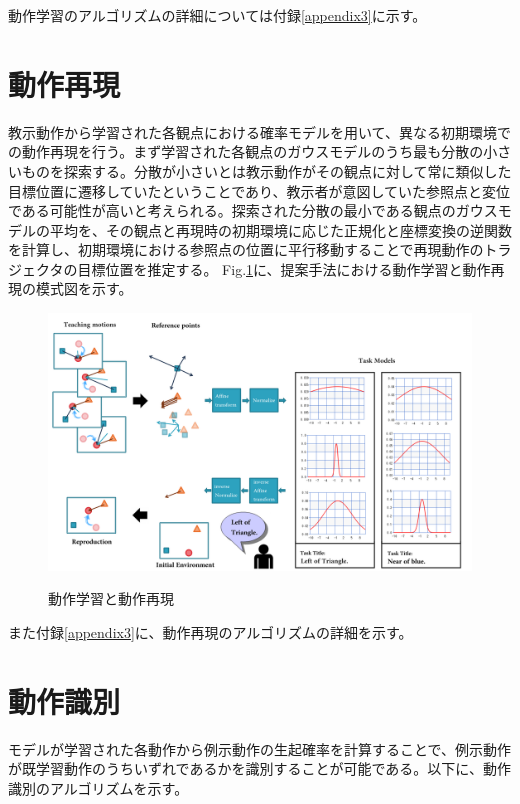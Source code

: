 動作学習のアルゴリズムの詳細については付録\ref{appendix3}に示す。


\section{動作再現}

教示動作から学習された各観点における確率モデルを用いて、異なる初期環境での動作再現を行う。まず学習された各観点のガウスモデルのうち最も分散の小さいものを探索する。分散が小さいとは教示動作がその観点に対して常に類似した目標位置に遷移していたということであり、教示者が意図していた参照点と変位である可能性が高いと考えられる。探索された分散の最小である観点のガウスモデルの平均を、その観点と再現時の初期環境に応じた正規化と座標変換の逆関数を計算し、初期環境における参照点の位置に平行移動することで再現動作のトラジェクタの目標位置を推定する。
Fig.\ref{figure:learning_and_reproduction_model}に、提案手法における動作学習と動作再現の模式図を示す。
	\begin{figure}[h]
		\begin{center}
			\includegraphics[width=17cm]{chart1.png} \\ %
			\caption{動作学習と動作再現}
			\label{figure:learning_and_reproduction_model}
		\end{center}
	\end{figure}

また付録\ref{appendix3}に、動作再現のアルゴリズムの詳細を示す。

\section{動作識別}

モデルが学習された各動作から例示動作の生起確率を計算することで、例示動作が既学習動作のうちいずれであるかを識別することが可能である。以下に、動作識別のアルゴリズムを示す。
